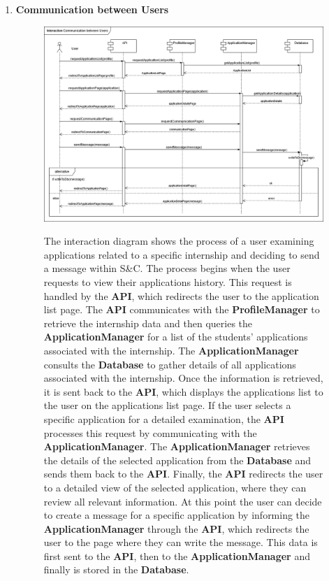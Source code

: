 \begin{enumerate}
    \newpage
    \item \textbf{Communication between Users}
    \begin{figure}[h!]
            \centering  \includegraphics[width=1\textwidth]{DD/Images/Interactions/INT17_ CommunicationBetweenUsers.drawio.png}
            \label{fig:ComponentViewDiagram}
            \caption{
            The interaction diagram shows the process of a user examining applications related to a specific internship and deciding to send a message within S\&C. The process begins when the user requests to view their applications history. This request is handled by the \textbf{API}, which redirects the user to the application list page. The \textbf{API} communicates with the \textbf{ProfileManager} to retrieve the internship data and then queries the \textbf{ApplicationManager} for a list of the students’ applications associated with the internship.
            The \textbf{ApplicationManager} consults the \textbf{Database} to gather details of all applications associated with the internship. 
            Once the information is retrieved, it is sent back to the \textbf{API}, which displays the applications list to the user on the applications list page.
            If the user selects a specific application for a detailed examination, the \textbf{API} processes this request by communicating with the \textbf{ApplicationManager}. The \textbf{ApplicationManager} retrieves the details of the selected application from the \textbf{Database} and sends them back to the \textbf{API}. 
            Finally, the \textbf{API} redirects the user to a detailed view of the selected application, where they can review all relevant information.
            At this point the user can decide to create a message for a specific application by informing the \textbf{ApplicationManager} through the \textbf{API}, which redirects the user to the page where they can write the message. This data is first sent to the \textbf{API}, then to the \textbf{ApplicationManager} and finally is stored in the \textbf{Database}. 
}
\end{figure}
\end{enumerate}
